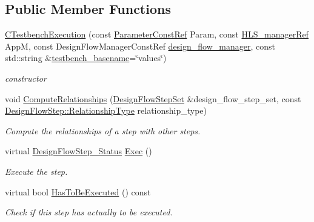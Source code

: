 \subsection*{Public Member Functions}
\begin{DoxyCompactItemize}
\item 
\hyperlink{classCTestbenchExecution_a9e90aae59cc30f1b49deb86eb584abeb}{C\+Testbench\+Execution} (const \hyperlink{Parameter_8hpp_a37841774a6fcb479b597fdf8955eb4ea}{Parameter\+Const\+Ref} Param, const \hyperlink{hls__manager_8hpp_acd3842b8589fe52c08fc0b2fcc813bfe}{H\+L\+S\+\_\+manager\+Ref} AppM, const Design\+Flow\+Manager\+Const\+Ref \hyperlink{classDesignFlowStep_ab770677ddf087613add30024e16a5554}{design\+\_\+flow\+\_\+manager}, const std\+::string \&\hyperlink{classCTestbenchExecution_ab4ede64e226a637b246ff924c69ec629}{testbench\+\_\+basename}=\char`\"{}values\char`\"{})
\begin{DoxyCompactList}\small\item\em constructor \end{DoxyCompactList}\item 
void \hyperlink{classCTestbenchExecution_ac3b75ac39514d02be971318c2b9018e9}{Compute\+Relationships} (\hyperlink{classDesignFlowStepSet}{Design\+Flow\+Step\+Set} \&design\+\_\+flow\+\_\+step\+\_\+set, const \hyperlink{classDesignFlowStep_a723a3baf19ff2ceb77bc13e099d0b1b7}{Design\+Flow\+Step\+::\+Relationship\+Type} relationship\+\_\+type)
\begin{DoxyCompactList}\small\item\em Compute the relationships of a step with other steps. \end{DoxyCompactList}\item 
virtual \hyperlink{design__flow__step_8hpp_afb1f0d73069c26076b8d31dbc8ebecdf}{Design\+Flow\+Step\+\_\+\+Status} \hyperlink{classCTestbenchExecution_a8c357be38d34d8472d3ed3914ec14aef}{Exec} ()
\begin{DoxyCompactList}\small\item\em Execute the step. \end{DoxyCompactList}\item 
virtual bool \hyperlink{classCTestbenchExecution_a33f54e90fb5810ea5df6adb1512f87bb}{Has\+To\+Be\+Executed} () const
\begin{DoxyCompactList}\small\item\em Check if this step has actually to be executed. \end{DoxyCompactList}\end{DoxyCompactItemize}
